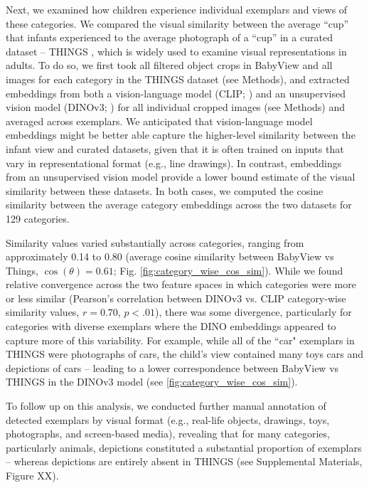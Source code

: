 Next, we examined how children experience individual exemplars and views of these categories.
We compared the visual similarity between the average ``cup'' that infants experienced to the average photograph of a ``cup'' in a curated dataset -- THINGS \citep{stoinski2024thingsplus}, which is widely used to examine visual representations in adults. To do so, we first took all filtered object crops in BabyView and all images for each category in the THINGS dataset (see Methods), and extracted embeddings from both a vision-language model (CLIP; \citet{radford2021learning}) and an unsupervised vision model (DINOv3; \citet{simeoni2025dinov3}) for all individual cropped images (see Methods) and averaged across exemplars. We anticipated that vision-language model embeddings might be better able capture the higher-level similarity between the infant view and curated datasets, given that it is often trained on inputs that vary in representational format (e.g., line drawings). In contrast, embeddings from an unsupervised vision model provide a lower bound estimate of the visual similarity between these datasets. In both cases, we computed the cosine similarity between the average category embeddings across the two datasets for 129 categories. 

Similarity values varied substantially across categories, ranging from approximately 0.14 to 0.80 (average cosine similarity between BabyView vs Things, $\cos(\theta)=0.61$; Fig. \ref{fig:category_wise_cos_sim}). While we found relative convergence across the two feature spaces in which categories were more or less similar (Pearson's correlation between DINOv3 vs. CLIP category-wise similarity values, $r = 0.70$, $p < .01$), there was some divergence, particularly for categories with diverse exemplars where the DINO embeddings appeared to  capture more of this variability. For example, while all of the ``car" exemplars in THINGS were photographs of cars, the child's view contained many toys cars and depictions of cars -- leading to a lower correspondence between BabyView vs THINGS in the DINOv3 model (see \ref{fig:category_wise_cos_sim}). 

To follow up on this analysis, we conducted further manual annotation of detected exemplars by visual format (e.g., real-life objects, drawings, toys, photographs, and screen-based media), revealing that for many categories, particularly animals, depictions constituted a substantial proportion of exemplars -- whereas  depictions are entirely absent in THINGS (see Supplemental Materials, Figure XX).


